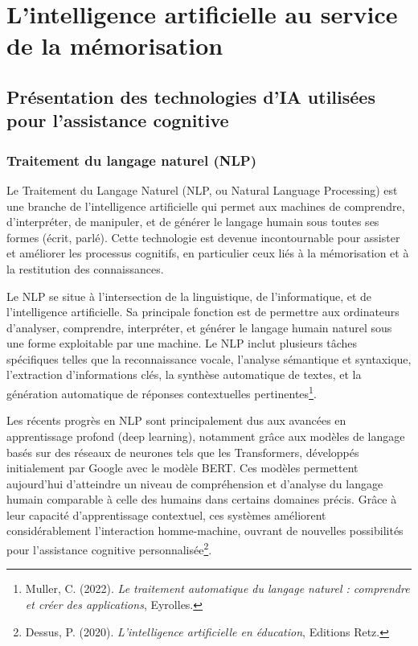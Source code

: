 \documentclass[12pt,a4paper]{report}
\begin{document}
\chapter{L’intelligence artificielle au service de la mémorisation}

\section{Présentation des technologies d’IA utilisées pour l’assistance cognitive}

\subsection{Traitement du langage naturel (NLP)}

Le Traitement du Langage Naturel (NLP, ou Natural Language Processing) est une branche de l’intelligence artificielle qui permet aux machines de comprendre, d’interpréter, de manipuler, et de générer le langage humain sous toutes ses formes (écrit, parlé). Cette technologie est devenue incontournable pour assister et améliorer les processus cognitifs, en particulier ceux liés à la mémorisation et à la restitution des connaissances.

Le NLP se situe à l’intersection de la linguistique, de l’informatique, et de l’intelligence artificielle. Sa principale fonction est de permettre aux ordinateurs d'analyser, comprendre, interpréter, et générer le langage humain naturel sous une forme exploitable par une machine. Le NLP inclut plusieurs tâches spécifiques telles que la reconnaissance vocale, l'analyse sémantique et syntaxique, l'extraction d'informations clés, la synthèse automatique de textes, et la génération automatique de réponses contextuelles pertinentes\footnote{Muller, C. (2022). \textit{Le traitement automatique du langage naturel : comprendre et créer des applications}, Eyrolles.}.

Les récents progrès en NLP sont principalement dus aux avancées en apprentissage profond (deep learning), notamment grâce aux modèles de langage basés sur des réseaux de neurones tels que les Transformers, développés initialement par Google avec le modèle BERT. Ces modèles permettent aujourd’hui d'atteindre un niveau de compréhension et d’analyse du langage humain comparable à celle des humains dans certains domaines précis. Grâce à leur capacité d'apprentissage contextuel, ces systèmes améliorent considérablement l'interaction homme-machine, ouvrant de nouvelles possibilités pour l’assistance cognitive personnalisée\footnote{Dessus, P. (2020). \textit{L’intelligence artificielle en éducation}, Editions Retz.}.
\end{document}

